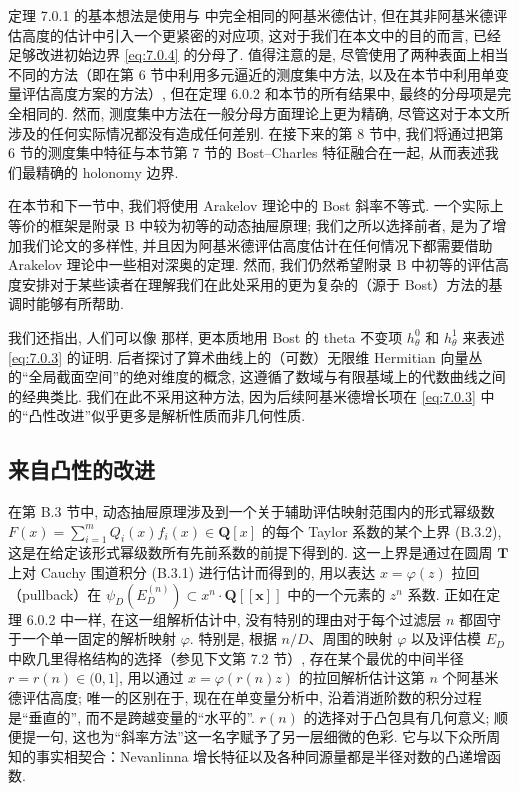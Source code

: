 定理 7.0.1 的基本想法是使用与 \cite{BC22} 中完全相同的阿基米德估计, 但在其非阿基米德评估高度的估计中引入一个更紧密的对应项, 这对于我们在本文中的目的而言, 已经足够改进初始边界 \eqref{eq:7.0.4} 的分母了. 
值得注意的是, 尽管使用了两种表面上相当不同的方法（即在第 6 节中利用多元逼近的测度集中方法, 以及在本节中利用单变量评估高度方案的方法）, 
但在定理 6.0.2 和本节的所有结果中, 最终的分母项是完全相同的. 
然而, 测度集中方法在一般分母方面理论上更为精确, 尽管这对于本文所涉及的任何实际情况都没有造成任何差别. 
在接下来的第 8 节中, 我们将通过把第 6 节的测度集中特征与本节第 7 节的 Bost--Charles 特征融合在一起, 从而表述我们最精确的 holonomy 边界.

在本节和下一节中, 我们将使用 Arakelov 理论中的 Bost 斜率不等式. 
一个实际上等价的框架是附录 B 中较为初等的动态抽屉原理; 
我们之所以选择前者, 是为了增加我们论文的多样性, 并且因为阿基米德评估高度估计在任何情况下都需要借助 Arakelov 理论中一些相对深奥的定理. 
然而, 我们仍然希望附录 B 中初等的评估高度安排对于某些读者在理解我们在此处采用的更为复杂的（源于 Bost）方法的基调时能够有所帮助.

我们还指出, 人们可以像 \cite{Bos20}\cite{BC22} 那样, 更本质地用 Bost 的 theta 不变项 \(h_{\theta}^{0}\) 和 \(h_{\theta}^{1}\) 来表述 \eqref{eq:7.0.3} 的证明. 
后者探讨了算术曲线上的（可数）无限维 Hermitian 向量丛的``全局截面空间''的绝对维度的概念, 
这遵循了数域与有限基域上的代数曲线之间的经典类比. 
我们在此不采用这种方法, 因为后续阿基米德增长项在 \eqref{eq:7.0.3} 中的``凸性改进''似乎更多是解析性质而非几何性质.

\subsection{来自凸性的改进}\label{sec:7.1}

在第 B.3 节中, 动态抽屉原理涉及到一个关于辅助评估映射范围内的形式幂级数 
\(F(x) = \sum_{i=1}^{m} Q_i(x) f_i(x) \in \mathbf{Q}[x]\) 
的每个 Taylor 系数的某个上界 (B.3.2), 
这是在给定该形式幂级数所有先前系数的前提下得到的. 
这一上界是通过在圆周 \(\mathbf{T}\) 上对 Cauchy 围道积分 (B.3.1) 进行估计而得到的, 
用以表达 \(x = \varphi(z)\) 拉回（pullback）在 \(\psi_D\left(E_D^{(n)}\right) \subset x^n \cdot \mathbf{Q}[\![\mathbf{x}]\!]\) 中的一个元素的 \(z^n\) 系数. 
正如在定理 6.0.2 中一样, 在这一组解析估计中, 没有特别的理由对于每个过滤层 \(n\) 都固守于一个单一固定的解析映射 \(\varphi\). 
特别是, 根据 \(n/D\)、周围的映射 \(\varphi\) 以及评估模 \(E_D\) 中欧几里得格结构的选择（参见下文第 7.2 节）, 
存在某个最优的中间半径 \(r = r(n) \in (0,1]\), 
用以通过 \(x = \varphi(r(n)z)\) 的拉回解析估计这第 \(n\) 个阿基米德评估高度; 
唯一的区别在于, 现在在单变量分析中, 沿着消逝阶数的积分过程是``垂直的'', 
而不是跨越变量的``水平的''. 
\(r(n)\) 的选择对于凸包具有几何意义; 
顺便提一句, 这也为``斜率方法''这一名字赋予了另一层细微的色彩. 
它与以下众所周知的事实相契合：Nevanlinna 增长特征以及各种同源量都是半径对数的凸递增函数.

